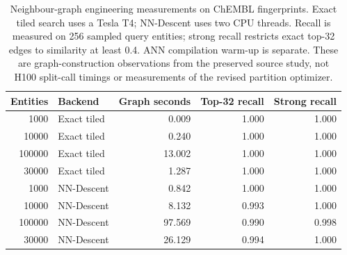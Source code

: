 \begin{table}[htbp]\centering\small
\begin{tabular}{rlrrr}
\toprule
Entities & Backend & Graph seconds & Top-32 recall & Strong recall \\
\midrule
1000 & Exact tiled & 0.009 & 1.000 & 1.000 \\
10000 & Exact tiled & 0.240 & 1.000 & 1.000 \\
100000 & Exact tiled & 13.002 & 1.000 & 1.000 \\
30000 & Exact tiled & 1.287 & 1.000 & 1.000 \\
1000 & NN-Descent & 0.842 & 1.000 & 1.000 \\
10000 & NN-Descent & 8.132 & 0.993 & 1.000 \\
100000 & NN-Descent & 97.569 & 0.990 & 0.998 \\
30000 & NN-Descent & 26.129 & 0.994 & 1.000 \\
\bottomrule
\end{tabular}
\caption{Neighbour-graph engineering measurements on ChEMBL fingerprints. Exact tiled search uses a Tesla T4; NN-Descent uses two CPU threads. Recall is measured on 256 sampled query entities; strong recall restricts exact top-32 edges to similarity at least 0.4. ANN compilation warm-up is separate. These are graph-construction observations from the preserved source study, not H100 split-call timings or measurements of the revised partition optimizer.}\end{table}
